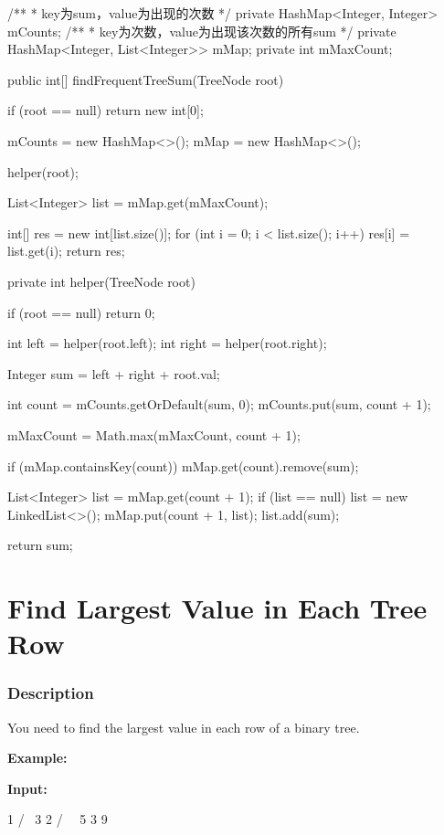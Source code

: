 \begin{Code}
/**
 * key为sum，value为出现的次数
 */
private HashMap<Integer, Integer> mCounts;
/**
 * key为次数，value为出现该次数的所有sum
 */
private HashMap<Integer, List<Integer>> mMap;
private int mMaxCount;

public int[] findFrequentTreeSum(TreeNode root) {
    if (root == null) {
        return new int[0];
    }

    mCounts = new HashMap<>();
    mMap = new HashMap<>();

    helper(root);

    List<Integer> list = mMap.get(mMaxCount);

    int[] res = new int[list.size()];
    for (int i = 0; i < list.size(); i++) {
        res[i] = list.get(i);
    }
    return res;
}

private int helper(TreeNode root) {
    if (root == null) {return 0;}

    int left = helper(root.left);
    int right = helper(root.right);

    Integer sum = left + right + root.val;


    int count = mCounts.getOrDefault(sum, 0);
    mCounts.put(sum, count + 1);

    mMaxCount = Math.max(mMaxCount, count + 1);

    if (mMap.containsKey(count)) {
        mMap.get(count).remove(sum);
    }

    List<Integer> list = mMap.get(count + 1);
    if (list == null) {
        list = new LinkedList<>();
        mMap.put(count + 1, list);
    }
    list.add(sum);

    return sum;
}
\end{Code}

\newpage

\section{Find Largest Value in Each Tree Row} %

\subsubsection{Description}
You need to find the largest value in each row of a binary tree.

\textbf{Example:}

\textbf{Input:}
\begin{Code}
          1
         / \
        3   2
       / \   \
      5   3   9
\end{Code}

